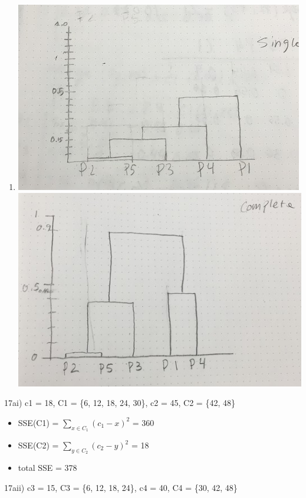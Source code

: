 \documentclass[11pt]{article}
\makeatletter
\def\maxwidth{\ifdim\Gin@nat@width>\linewidth\linewidth
    \else\Gin@nat@width\fi}
\let\Oldincludegraphics\includegraphics
\renewcommand{\includegraphics}[1]{\Oldincludegraphics[width=.8\maxwidth]{#1}}
\providecommand{\tightlist}{%
      \setlength{\itemsep}{0pt}\setlength{\parskip}{0pt}}
\makeatother
\begin{document}
    \begin{enumerate}
\def\labelenumi{\arabic{enumi})}
\setcounter{enumi}{15}
\tightlist
\item
  \includegraphics{IMG-2832.JPG} \includegraphics{complete.jpg}
\end{enumerate}

    17ai) c1 = 18, C1 = \{6, 12, 18, 24, 30\}, c2 = 45, C2 = \{42, 48\}

\begin{itemize}
\item
  SSE(C1) = \(\sum_{x\in C_1} (c_1 - x)^2\) = 360
\item
  SSE(C2) = \(\sum_{y\in C_2} (c_2 - y)^2\) = 18
\item
  total SSE = 378
\end{itemize}

17aii) c3 = 15, C3 = \{6, 12, 18, 24\}, c4 = 40, C4 = \{30, 42, 48\}
\end{document}
